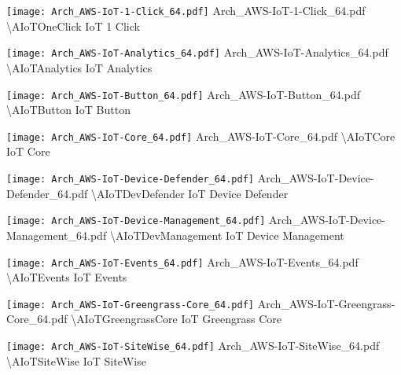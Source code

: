  {\texttt{[image: Arch\_AWS-IoT-1-Click\_64.pdf]}} {Arch\_AWS-IoT-1-Click\_64.pdf} {{\textbackslash}AIoTOneClick} {IoT 1 Click}

 {\texttt{[image: Arch\_AWS-IoT-Analytics\_64.pdf]}} {Arch\_AWS-IoT-Analytics\_64.pdf} {{\textbackslash}AIoTAnalytics} {IoT Analytics}

 {\texttt{[image: Arch\_AWS-IoT-Button\_64.pdf]}} {Arch\_AWS-IoT-Button\_64.pdf} {{\textbackslash}AIoTButton} {IoT Button}

 {\texttt{[image: Arch\_AWS-IoT-Core\_64.pdf]}} {Arch\_AWS-IoT-Core\_64.pdf} {{\textbackslash}AIoTCore} {IoT Core}

 {\texttt{[image: Arch\_AWS-IoT-Device-Defender\_64.pdf]}} {Arch\_AWS-IoT-Device-Defender\_64.pdf} {{\textbackslash}AIoTDevDefender} {IoT Device Defender}

 {\texttt{[image: Arch\_AWS-IoT-Device-Management\_64.pdf]}} {Arch\_AWS-IoT-Device-Management\_64.pdf} {{\textbackslash}AIoTDevManagement} {IoT Device Management}

 {\texttt{[image: Arch\_AWS-IoT-Events\_64.pdf]}} {Arch\_AWS-IoT-Events\_64.pdf} {{\textbackslash}AIoTEvents} {IoT Events}

 {\texttt{[image: Arch\_AWS-IoT-Greengrass-Core\_64.pdf]}} {Arch\_AWS-IoT-Greengrass-Core\_64.pdf} {{\textbackslash}AIoTGreengrassCore} {IoT Greengrass Core}

 {\texttt{[image: Arch\_AWS-IoT-SiteWise\_64.pdf]}} {Arch\_AWS-IoT-SiteWise\_64.pdf} {{\textbackslash}AIoTSiteWise} {IoT SiteWise}

